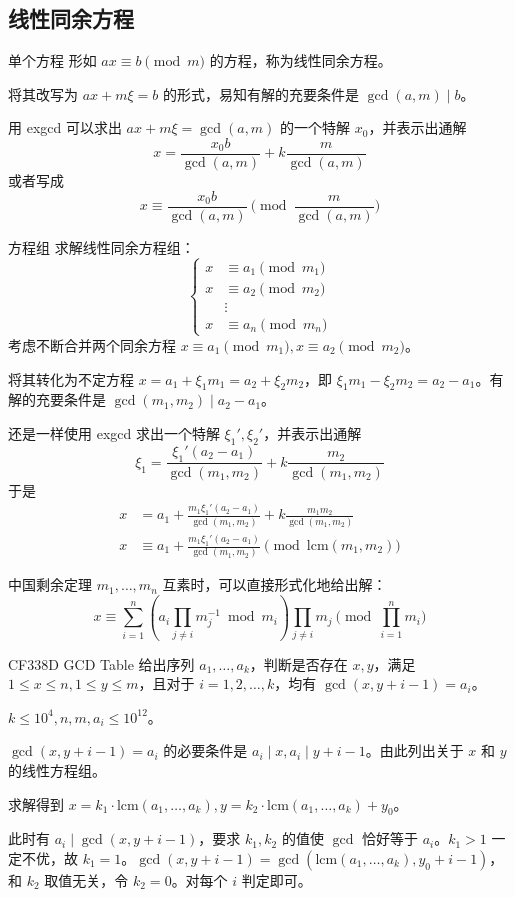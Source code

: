 \documentclass [hyperref={bookmarksdepth=4}, aspectratio=169] {beamer}
\theoremstyle {fy}
\begin{document}
\subsection{线性同余方程}

\begin{frame}{单个方程}
形如 $ax\equiv b\pmod m$ 的方程，称为线性同余方程。

将其改写为 $ax+m\xi=b$ 的形式，易知有解的充要条件是 $\gcd(a,m)\mid b$。

用 exgcd 可以求出 $ax+m\xi=\gcd(a,m)$ 的一个特解 $x_0$，并表示出通解
$$
x=\frac{x_0b}{\gcd(a,m)}+k\frac{m}{\gcd(a,m)}
$$
或者写成
$$
x\equiv \frac{x_0b}{\gcd(a,m)}\pmod{\frac{m}{\gcd(a,m)}}
$$
\end{frame}

\begin{frame}{方程组}
求解线性同余方程组：
$$
\left\{
\begin{aligned}
x&\equiv a_1\pmod{m_1}\\
x&\equiv a_2\pmod{m_2}\\
&\vdots\\
x&\equiv a_n\pmod{m_n}
\end{aligned}
\right.
$$
考虑不断合并两个同余方程 $x\equiv a_1\pmod{m_1},x\equiv a_2\pmod{m_2}$。

将其转化为不定方程 $x=a_1+\xi_1m_1=a_2+\xi_2m_2$，即 $\xi_1m_1-\xi_2m_2=a_2-a_1$。有解的充要条件是 $\gcd(m_1,m_2)\mid a_2-a_1$。

还是一样使用 exgcd 求出一个特解 $\xi_1',\xi_2'$，并表示出通解
$$
\xi_1=\frac{\xi_1'(a_2-a_1)}{\gcd(m_1,m_2)}+k\frac{m_2}{\gcd(m_1,m_2)}
$$
于是
$$
\begin{aligned}
x&=a_1+\frac{m_1\xi_1'(a_2-a_1)}{\gcd(m_1,m_2)}+k\frac{m_1m_2}{\gcd(m_1,m_2)}\\
x&\equiv a_1+\frac{m_1\xi_1'(a_2-a_1)}{\gcd(m_1,m_2)}\pmod{\mathrm{lcm}(m_1,m_2)}
\end{aligned}
$$
\end{frame}

\begin{frame}{中国剩余定理}
$m_1,\dots,m_n$ 互素时，可以直接形式化地给出解：
$$
x\equiv \sum_{i=1}^n(a_i\prod_{j\ne i}m_j^{-1}\bmod m_i)\prod_{j\neq i}m_j\pmod{\prod_{i=1}^n m_i}
$$
\end{frame}

\begin{frame}{CF338D GCD Table}
给出序列 $a_1,\dots,a_k$，判断是否存在 $x,y$，满足 $1\le x\le n,1\le y\le m$，且对于 $i=1,2,\dots,k$，均有 $\gcd(x,y+i-1)=a_i$。

$k\le 10^4,n,m,a_i\le 10^{12}$。

$\gcd(x,y+i-1)=a_i$ 的必要条件是 $a_i\mid x,a_i\mid y+i-1$。由此列出关于 $x$ 和 $y$ 的线性方程组。

求解得到 $x=k_1\cdot\mathrm{lcm}(a_1,\dots,a_k),y=k_2\cdot\mathrm{lcm}(a_1,\dots,a_k)+y_0$。

此时有 $a_i\mid\gcd(x,y+i-1)$，要求 $k_1,k_2$ 的值使 $\gcd$ 恰好等于 $a_i$。$k_1>1$ 一定不优，故 $k_1=1$。$\gcd(x,y+i-1)=\gcd(\mathrm{lcm}(a_1,\dots,a_k),y_0+i-1)$，和 $k_2$ 取值无关，令 $k_2=0$。对每个 $i$ 判定即可。
\end{frame}
\end{document}
